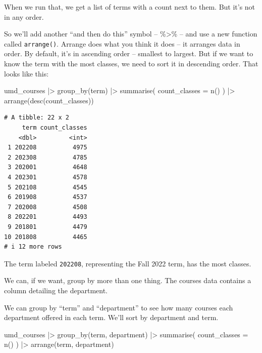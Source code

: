 \documentclass[
  letterpaper,
  DIV=11,
  numbers=noendperiod]{scrreprt}
\newenvironment{Shaded}{\begin{snugshade}}{\end{snugshade}}
\newcommand{\AttributeTok}[1]{\textcolor[rgb]{0.40,0.45,0.13}{#1}}
\newcommand{\FunctionTok}[1]{\textcolor[rgb]{0.28,0.35,0.67}{#1}}
\newcommand{\NormalTok}[1]{\textcolor[rgb]{0.00,0.23,0.31}{#1}}
\newcommand{\SpecialCharTok}[1]{\textcolor[rgb]{0.37,0.37,0.37}{#1}}
\begin{document}
When we run that, we get a list of terms with a count next to them. But
it's not in any order.

So we'll add another ``and then do this'' symbol -- \%\textgreater\% --
and use a new function called \texttt{arrange()}. Arrange does what you
think it does -- it arranges data in order. By default, it's in
ascending order -- smallest to largest. But if we want to know the term
with the most classes, we need to sort it in descending order. That
looks like this:

\begin{Shaded}
\begin{Highlighting}[]
\NormalTok{umd\_courses }\SpecialCharTok{|\textgreater{}}
  \FunctionTok{group\_by}\NormalTok{(term) }\SpecialCharTok{|\textgreater{}}
  \FunctionTok{summarise}\NormalTok{(}
    \AttributeTok{count\_classes =} \FunctionTok{n}\NormalTok{()}
\NormalTok{  ) }\SpecialCharTok{|\textgreater{}}
  \FunctionTok{arrange}\NormalTok{(}\FunctionTok{desc}\NormalTok{(count\_classes))}
\end{Highlighting}
\end{Shaded}

\begin{verbatim}
# A tibble: 22 x 2
     term count_classes
    <dbl>         <int>
 1 202208          4975
 2 202308          4785
 3 202001          4648
 4 202301          4578
 5 202108          4545
 6 201908          4537
 7 202008          4508
 8 202201          4493
 9 201801          4479
10 201808          4465
# i 12 more rows
\end{verbatim}

The term labeled \texttt{202208}, representing the Fall 2022 term, has
the most classes.

We can, if we want, group by more than one thing. The courses data
contains a column detailing the department.

We can group by ``term'' and ``department'' to see how many courses each
department offered in each term. We'll sort by department and term.

\begin{Shaded}
\begin{Highlighting}[]
\NormalTok{umd\_courses }\SpecialCharTok{|\textgreater{}}
  \FunctionTok{group\_by}\NormalTok{(term, department) }\SpecialCharTok{|\textgreater{}}
  \FunctionTok{summarise}\NormalTok{(}
    \AttributeTok{count\_classes =} \FunctionTok{n}\NormalTok{()}
\NormalTok{  ) }\SpecialCharTok{|\textgreater{}}
  \FunctionTok{arrange}\NormalTok{(term, department)}
\end{Highlighting}
\end{Shaded}
\end{document}
